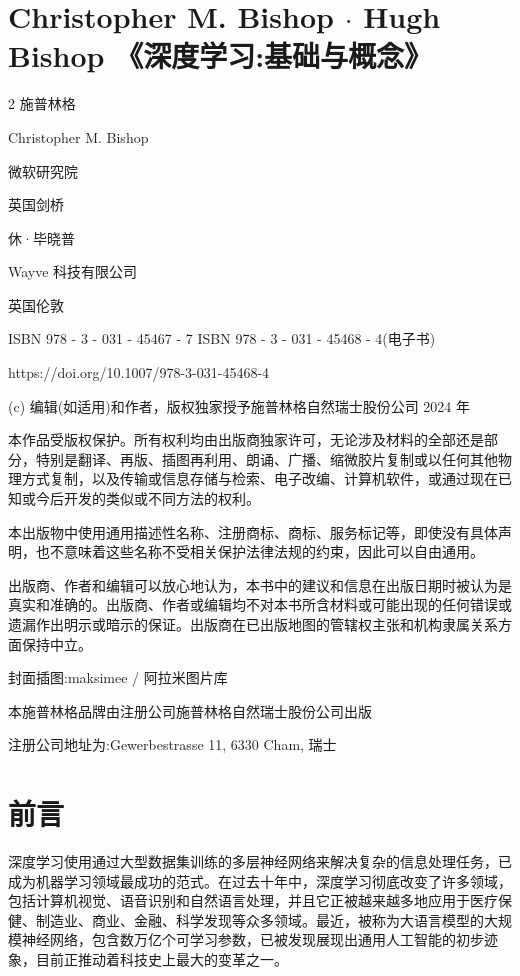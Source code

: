 \documentclass[10pt]{report}
\newcommand{\customfootnote}[1]{
  \let\thefootnote\relax\footnotetext{#1}
}
\begin{document}
\customfootnote{

深度学习

}

\section*{Christopher M. Bishop \(\cdot\) Hugh Bishop 《深度学习:基础与概念》}

2 施普林格

Christopher M. Bishop

微软研究院

英国剑桥

休·毕晓普

Wayve 科技有限公司

英国伦敦

ISBN 978 - 3 - 031 - 45467 - 7 ISBN 978 - 3 - 031 - 45468 - 4(电子书)

https://doi.org/10.1007/978-3-031-45468-4

(c) 编辑(如适用)和作者，版权独家授予施普林格自然瑞士股份公司 2024 年

本作品受版权保护。所有权利均由出版商独家许可，无论涉及材料的全部还是部分，特别是翻译、再版、插图再利用、朗诵、广播、缩微胶片复制或以任何其他物理方式复制，以及传输或信息存储与检索、电子改编、计算机软件，或通过现在已知或今后开发的类似或不同方法的权利。

本出版物中使用通用描述性名称、注册商标、商标、服务标记等，即使没有具体声明，也不意味着这些名称不受相关保护法律法规的约束，因此可以自由通用。

出版商、作者和编辑可以放心地认为，本书中的建议和信息在出版日期时被认为是真实和准确的。出版商、作者或编辑均不对本书所含材料或可能出现的任何错误或遗漏作出明示或暗示的保证。出版商在已出版地图的管辖权主张和机构隶属关系方面保持中立。

封面插图:maksimee / 阿拉米图片库

本施普林格品牌由注册公司施普林格自然瑞士股份公司出版

注册公司地址为:Gewerbestrasse 11, 6330 Cham, 瑞士

\section*{前言}

深度学习使用通过大型数据集训练的多层神经网络来解决复杂的信息处理任务，已成为机器学习领域最成功的范式。在过去十年中，深度学习彻底改变了许多领域，包括计算机视觉、语音识别和自然语言处理，并且它正被越来越多地应用于医疗保健、制造业、商业、金融、科学发现等众多领域。最近，被称为大语言模型的大规模神经网络，包含数万亿个可学习参数，已被发现展现出通用人工智能的初步迹象，目前正推动着科技史上最大的变革之一。
\end{document}
